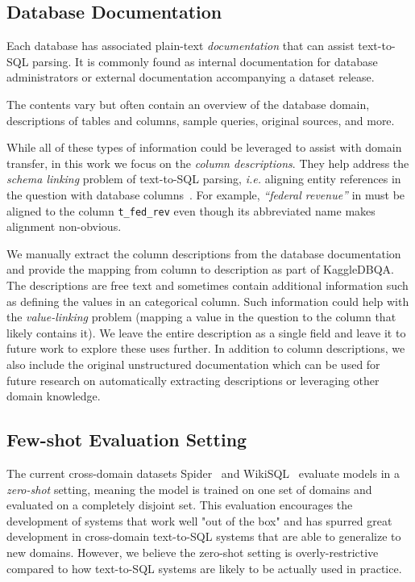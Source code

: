 \documentclass[11pt,a4paper]{article}
\newcommand{\systemname}{\mbox{KaggleDBQA}\xspace}
\newcommand{\ie}{\textit{i.e.}\xspace}
\newcommand{\sql}[1]{\lstinline[language=SQL, basicstyle=\footnotesize\ttfamily]{#1}}
\begin{document}
\subsection{Database Documentation}
\label{sec:dataset:docs}
Each database has associated plain-text \emph{documentation} that can assist text-to-SQL parsing.
It is commonly found as internal documentation for database administrators or external documentation accompanying a
dataset release.

The contents vary but often contain an overview of the database domain, descriptions of tables and columns, sample
queries, original sources, and more.

While all of these types of information could be leveraged to assist with domain transfer,
in this work we focus on the \emph{column descriptions}.
They help address the \emph{schema linking} problem of text-to-SQL parsing, \ie aligning entity references in the
question with database columns~\cite{wang-etal-2020-rat}.
For example, \textit{``federal revenue''} in  must be aligned to the column \sql{t_fed_rev}
even though its abbreviated name makes alignment non-obvious.

We manually extract the column descriptions from the database documentation and provide the mapping from column to
description as part of \systemname.
The descriptions are free text and sometimes contain additional information such as defining the values in an categorical
column.
Such information could help with the \textit{value-linking} problem (mapping a value in the question to the column that
likely contains it).
We leave the entire description as a single field and leave it to future work to explore these uses further.
In addition to column descriptions, we also include the original unstructured documentation which can be used for future
research on automatically extracting descriptions or leveraging other domain knowledge.

\subsection{Few-shot Evaluation Setting}
The current cross-domain datasets Spider~\cite{yu-etal-2018-spider} and WikiSQL~\cite{zhong2017seq2sql} evaluate models
in a \textit{zero-shot} setting, meaning the model is trained on one set of domains and evaluated on a completely
disjoint set.
This evaluation encourages the development of systems that work well "out of the box" and has spurred great development
in cross-domain text-to-SQL systems that are able to generalize to new domains.
However, we believe the zero-shot setting is overly-restrictive compared to how text-to-SQL systems are likely to be
actually used in practice.
\end{document}
